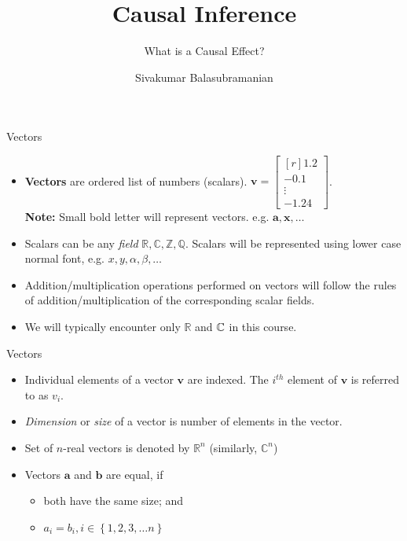 \documentclass[aspectratio=169]{beamer}
\title{Causal Inference}
\subtitle{What is a Causal Effect?}
\author{Sivakumar Balasubramanian}
\institute[Christian Medical College] %
{
  \inst{}%
  Department of Bioengineering\\
  Christian Medical College, Bagayam\\
  Vellore 632002
}
\date{}
\let\olditem\item
\renewcommand{\item}{\setlength{\itemsep}{\fill}\olditem}
\def\mb{\ensuremath\mathbb}
\begin{document}
\begin{frame}
  \titlepage
\end{frame}


\begin{frame}[t]{Vectors}
\begin{itemize}
  \item \textbf{Vectors} are ordered list of numbers (scalars). $\mathbf{v} = \begin{bmatrix*}[r] 1.2 \\ -0.1 \\ \vdots \\-1.24 \end{bmatrix*}$.\\
  \textbf{Note:} Small bold letter will represent vectors. e.g. $\mathbf{a}, \mathbf{x}, \ldots $
  
  \item Scalars can be any \textit{field} $\mathbb{R}, \mathbb{C}, \mathbb{Z}, \mathbb{Q}$. Scalars will be represented using lower case normal font, e.g. $x, y, \alpha, \beta, \ldots$
  
  \item Addition/multiplication operations performed on vectors will follow the rules of addition/multiplication of the corresponding scalar fields.
  
  \item We will typically encounter only $\mathbb{R}$ and $\mb{C}$ in this course.
\end{itemize}
\end{frame}


\begin{frame}[t]{Vectors}
\begin{itemize}
  \item Individual elements of a vector $\mathbf{v}$ are indexed. The $i^{th}$ element of $\mathbf{v}$ is referred to as $v_i$.

  \item \textit{Dimension} or \textit{size} of a vector is number of elements in the vector.
  
  \item Set of $n$-real vectors is denoted by $\mathbb{R}^n$ (similarly, $\mathbb{C}^n$)
  
  \item Vectors $\mathbf{a}$ and $\mathbf{b}$ are equal, if
  \begin{itemize}
    \item both have the same size; and
    \item $a_i = b_i, i \in \left\{1, 2, 3, \ldots n\right\}$
  \end{itemize}
  \end{itemize}
\end{frame}
\end{document}

